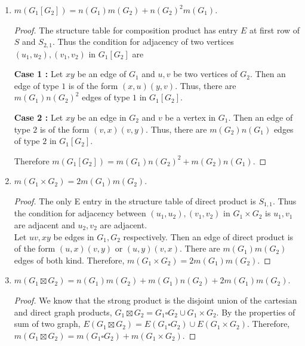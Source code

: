 \begin{exercise}
\begin{enumerate}
\begin{proof}
		\textbf{Case 2 :} Let $xy$ be an edge of $G_1$ and $v$ be a vertex of $G_2$. Then $(x,v),(y,v)$ are adjacent in $G_1 \square G_2$. Every edge of type 2 is of this form. Therefore, there are $m(G_1)n(G_2)$ edges of type $2$ in $G_1 \square G_2$.
		Therefore, $m(G_1 \square G_2) = n(G_1)m(G_2) + m(G_1)n(G_2)$.
	\end{proof}
	\item $m(G_1[G_2]) = n(G_1) m(G_2) + n(G_2)^2 m(G_1)$.
	\begin{proof}
		The structure table for composition product has entry $E$ at first row of $S$ and $S_{2,1}$. Thus the condition for adjacency of two vertices $(u_1,u_2),(v_1,v_2)$ in $G_1[G_2]$ are

		\textbf{Case 1 :} Let $xy$ be an edge of $G_1$ and $u,v$ be two vertices of $G_2$. Then an edge of type $1$ is of the form $(x,u)(y,v)$. Thus, there are $m(G_1)n(G_2)^2$ edges of type $1$ in $G_1[G_2]$.

		\textbf{Case 2 :} Let $xy$ be an edge in $G_2$ and $v$ be a vertex in $G_1$. Then an edge of type $2$ is of the form $(v,x)(v,y)$. Thus, there are $m(G_2)n(G_1)$ edges of type $2$ in $G_1[G_2]$.

		Therefore $m(G_1[G_2]) = m(G_1)n(G_2)^2 + m(G_2)n(G_1)$.
	\end{proof}
	\item $m(G_1 \times G_2) = 2m(G_1) m(G_2)$.
	\begin{proof}
		The only E entry in the structure table of direct product is $S_{1,1}$. Thus the condition for adjacency between $(u_1,u_2),(v_1,v_2)$ in $G_1 \times G_2$ is $u_1,v_1$ are adjacent and $u_2,v_2$ are adjacent.\\

		Let $uv,xy$ be edges in $G_1,G_2$ respectively. Then an edge of direct product is of the form $(u,x)(v,y)$ or $(u,y)(v,x)$. There are $m(G_1)m(G_2)$ edges of both kind.
		Therefore, $m(G_1 \times G_2) = 2m(G_1)m(G_2)$.
	\end{proof}
	\item $m(G_1 \boxtimes G_2) = n(G_1) m(G_2) + m(G_1) n(G_2) + 2m(G_1) m(G_2)$.
	\begin{proof}
		We know that the strong product is the disjoint union of the cartesian and direct graph products, $G_1 \boxtimes G_2 = G_1 \square G_2 \cup G_1 \times G_2$. 
		By the properties of sum of two graph, $E(G_1 \boxtimes G_2) = E(G_1 \square G_2) \cup E(G_1 \times G_2)$.
		Therefore, $m(G_1 \boxtimes G_2) = m(G_1 \square G_2) + m(G_1 \times G_2)$.
	\end{proof}
\end{enumerate}
\end{exercise}

